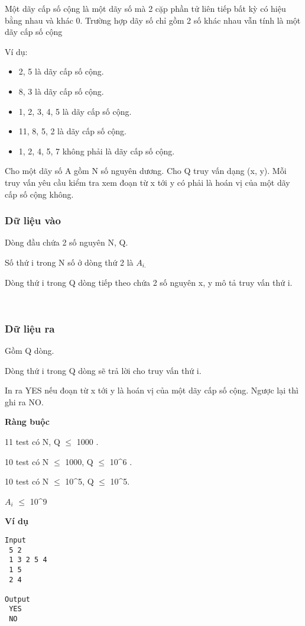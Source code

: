 

Một dãy cấp số cộng là một dãy số mà 2 cặp phần tử liên tiếp bất kỳ có hiệu bằng nhau và khác 0. Trường hợp dãy số chỉ gồm 2 số khác nhau vẫn tính là một dãy cấp số cộng

Ví dụ:
\begin{itemize}
	\item 2, 5 là dãy cấp số cộng.
	\item 8, 3 là dãy cấp số cộng.
	\item 1, 2, 3, 4, 5 là dãy cấp số cộng.
	\item 11, 8, 5, 2 là dãy cấp số cộng.
	\item 1, 2, 4, 5, 7 không phải là dãy cấp số cộng.
\end{itemize}

Cho một dãy số A gồm N số nguyên dương. Cho Q truy vấn dạng (x, y). Mỗi truy vấn yêu cầu kiểm tra xem đoạn từ x tới y có phải là hoán vị của một dãy cấp số cộng không.

\subsubsection{Dữ liệu vào}

Dòng đầu chứa 2 số nguyên N, Q.

Số thứ i trong N số ở dòng thứ 2 là $A_{i.}$

Dòng thứ i trong Q dòng tiếp theo chứa 2 số nguyên x, y mô tả truy vấn thứ i.

 

\subsubsection{Dữ liệu ra}

Gồm Q dòng.

Dòng thứ i trong Q dòng sẽ trả lời cho truy vấn thứ i.

In ra YES nếu đoạn từ x tới y là hoán vị của một dãy cấp số cộng. Ngược lại thì ghi ra NO.

\textbf{Ràng buộc}

11 test có N, Q  $\le$  1000 .

10 test có N  $\le$  1000, Q  $\le$  10^6 .

10 test có N  $\le$  10^5, Q  $\le$  10^5.

$A_{i}$  $\le$  10^9

\textbf{Ví dụ}
\begin{verbatim}
Input
 5 2
 1 3 2 5 4
 1 5
 2 4

Output
 YES
 NO


\end{verbatim}

 
